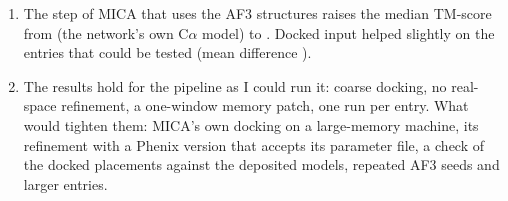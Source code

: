 \begin{enumerate}
\item The step of MICA that uses the AF3 structures raises the median TM-score from \MicaVarInitTmMed{} (the network's own C$\alpha$ model) to \MicaVarAllTmMed{}. Docked input helped slightly on the \DockEffectN{} entries that could be tested (mean difference \DockEffectMean{}).
\item The results hold for the pipeline as I could run it: coarse docking, no real-space refinement, a one-window memory patch, one run per entry. What would tighten them: MICA's own docking on a large-memory machine, its refinement with a Phenix version that accepts its parameter file, a check of the docked placements against the deposited models, repeated AF3 seeds and larger entries.
\end{enumerate}
